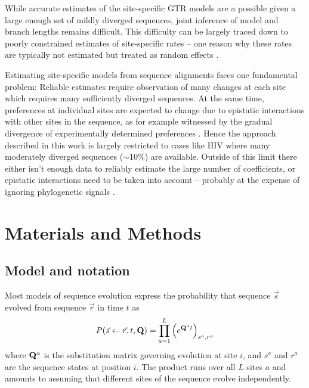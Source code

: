 \documentclass[aps,rmp,twocolumn]{revtex4}
\newcommand{\bq}{\begin{equation}}
\newcommand{\eq}{\end{equation}}
\newcommand{\mat}[1]{{\bf #1}}
\begin{document}
While accurate estimates of the site-specific GTR models are a possible given a large enough set of mildly diverged sequences, joint inference of model and branch lengths remains difficult.
This difficulty can be largely traced down to poorly constrained estimates of site-specific rates -- one  reason why these rates are typically not estimated but treated as random effects \citep{yang1996among}.

Estimating site-specific models from sequence alignments faces one fundamental problem:
Reliable estimates require observation of many changes at each site which requires many sufficiently diverged sequences.
At the same time, preferences at individual sites are expected to change due to epistatic interactions with other sites in the sequence, as for example witnessed by the gradual divergence of experimentally determined preferences \citep{doud_site-specific_2015,haddox_mapping_2018}.
Hence the approach described in this work is largely restricted to cases like HIV where many moderately diverged sequences ($\sim$10\%) are available.
Outside of this limit there either isn't enough data to reliably estimate the large number of coefficients, or epistatic interactions need to be taken into account -- probably at the expense of ignoring phylogenetic signals \citep{morcos_direct-coupling_2011}.




\onecolumngrid

\section*{Materials and Methods}
\subsection*{Model and notation}
\label{sec:MM_model}
Most models of sequence evolution express the probability that sequence $\vec{s}$ evolved from sequence $\vec{r}$ in time $t$ as
\bq
P(\vec{s}\leftarrow \vec{r},t,\mat{Q}) = \prod_{a=1}^L \left(e^{\mat{Q}^{a} t}\right)_{s^{a},r^{a}}
\label{eq:P_prob}
\eq
where $\mat{Q}^{a}$ is the substitution matrix governing evolution at site $i$, and $s^{a}$ and $r^{a}$ are the sequence states at position $i$.
The product runs over all $L$ sites $a$ and amounts to assuming that different sites of the sequence evolve independently.
\end{document}
